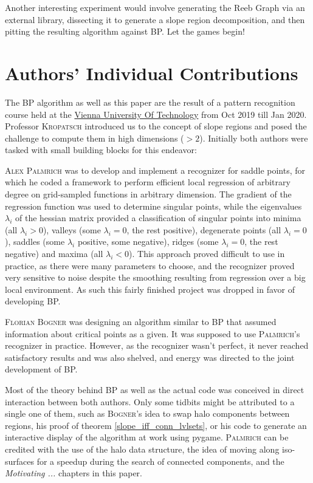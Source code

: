 \documentclass[a4paper,12pt,notitlepage,fullpage]{paper}
\theoremstyle{plain}
\theoremstyle{definition}
\begin{document}
Another interesting experiment would involve generating the Reeb Graph via an external library, dissecting it to generate a slope region decomposition, and then pitting the resulting algorithm against BP. Let the games begin!

\section{Authors' Individual Contributions}
The BP algorithm as well as this paper are the result of a pattern recognition course held at the \href{https://www.tuwien.at/en/}{Vienna University Of Technology} from Oct 2019 till Jan 2020. Professor \textsc{Kropatsch} introduced us to the concept of slope regions and posed the challenge to compute them in high dimensions ($>2$). Initially both authors were tasked with small building blocks for this endeavor:

\textsc{Alex Palmrich} was to develop and implement a recognizer for saddle points, for which he coded a framework to perform efficient local regression of arbitrary degree on grid-sampled functions in arbitrary dimension. The gradient of the regression function was used to determine singular points, while the eigenvalues $\lambda_i$ of the hessian matrix provided a classification of singular points into minima (all $\lambda_i>0$), valleys (some $\lambda_i=0$, the rest positive), degenerate points (all $\lambda_i=0$), saddles (some $\lambda_i$ positive, some negative), ridges (some $\lambda_i=0$, the rest negative) and maxima (all $\lambda_i<0$). This approach proved difficult to use in practice, as there were many parameters to choose, and the recognizer proved very sensitive to noise despite the smoothing resulting from regression over a big local environment. As such this fairly finished project was dropped in favor of developing BP.

\textsc{Florian Bogner} was designing an algorithm similar to BP that assumed information about critical points as a given. It was supposed to use \textsc{Palmrich}'s recognizer in practice. However, as the recognizer wasn't perfect, it never reached satisfactory results and was also shelved, and energy was directed to the joint development of BP.

Most of the theory behind BP as well as the actual code was conceived in direct interaction between both authors. Only some tidbits might be attributed to a single one of them, such as \textsc{Bogner}'s idea to swap halo components between regions, his proof of theorem \ref{slope_iff_conn_lvlsets}, or his code to generate an interactive display of the algorithm at work using pygame. \textsc{Palmrich} can be credited with the use of the halo data structure, the idea of moving along iso-surfaces for a speedup during the search of connected components, and the \emph{Motivating ...} chapters in this paper.




\end{document}
